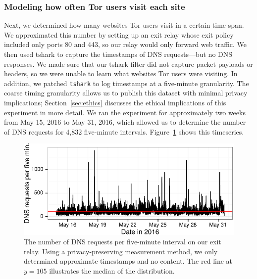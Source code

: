 \subsubsection{Modeling how often Tor users visit each site}
\label{sec:load-freq}
Next, we determined how many websites Tor users visit in a certain time span.
We approximated this number by setting up an exit relay whose exit policy
included only ports 80 and 443, so our relay would only forward web traffic.  We
then used tshark to capture the timestamps of DNS requests---but no DNS
responses.  We made sure that our tshark filter did not capture packet payloads
or headers, so we were unable to learn what websites Tor users were visiting.
In addition, we patched {\tt tshark} to log timestamps at a five-minute
granularity. The coarse timing granularity allows us to publish this
dataset with minimal privacy implications;
Section~\ref{sec:ethics} discusses the ethical implications of this
experiment in more detail.  We ran the experiment for approximately two weeks
from May 15, 2016 to May 31, 2016, which allowed us to determine the number of
DNS requests for 4,832 five-minute intervals.
Figure~\ref{fig:dns-reqs} shows this timeseries.

\begin{figure}[t]
	\centering
	\includegraphics[width=\linewidth]{figures/dns-reqs.pdf}
	\caption{The number of DNS requests per five-minute interval on our
	exit relay.  Using a privacy-preserving measurement method, we only
	determined approximate timestamps and no content.  The red line at $y = 105$
	illustrates the median of the distribution.}
	\label{fig:dns-reqs}
\end{figure}

